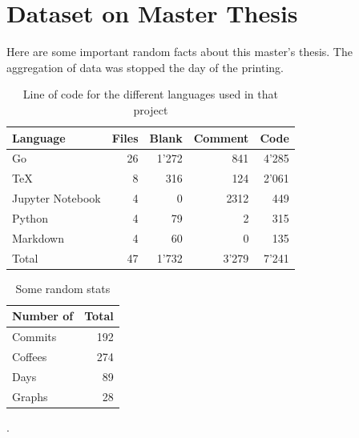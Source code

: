 \documentclass[a4paper,11pt,twoside=semi,openright]{report}
\begin{document}
\chapter{Dataset on Master Thesis}
Here are some important random facts about this master's thesis. The
aggregation of data was stopped the day of the printing. 
\begin{table}[h]
\centering
\begin{tabular}{@{}lrrrr@{}}
\toprule
\textbf{Language}   &\textbf{Files} & \textbf{Blank} & \textbf{Comment} & \textbf{Code} \\ \midrule
Go    & 26 & 1'272 & 841  & 4'285 \\ \hdashline
TeX    & 8  & 316 & 124  & 2'061 \\ \hdashline
Jupyter Notebook & 4  & 0  & 2312  & 449 \\ \hdashline
Python   & 4  & 79 & 2  & 315 \\ \hdashline
Markdown   & 4  & 60 & 0  & 135 \\ \midrule
Total   & 47 & 1'732 & 3'279 & 7'241 \\
\midrule
\bottomrule
\end{tabular}
\caption{Line of code for the different languages used in that project}
\label{tab:my-table}
\end{table}

\begin{table}[h]
\centering
\begin{tabular}{@{}lr@{}}
\toprule
\textbf{Number of}    & \textbf{Total} \\ \midrule
 Commits & 192 \\ \hdashline
 Coffees & 274 \\ \hdashline
Days & 89 \\ \hdashline
Graphs & 28 \\
\midrule
\bottomrule
\end{tabular}
\caption{Some random stats}.
\label{tab:my-table}
\end{table}
\end{document}
